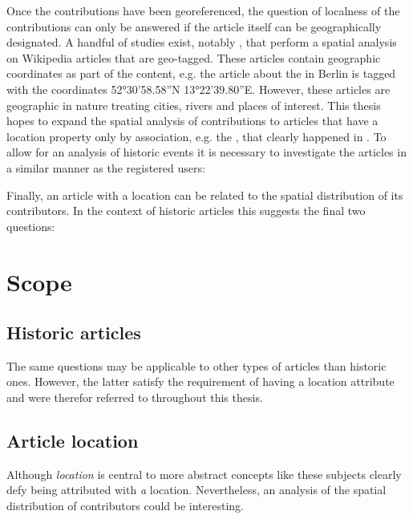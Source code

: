 Once the contributions have been georeferenced, the question of localness of the contributions can only be answered if the article itself can be geographically designated. 
A handful of studies exist, notably \cite{hardy2011volunteered,hecht2010localness}, that perform a spatial analysis on Wikipedia articles that are geo-tagged.
These articles contain geographic coordinates as part of the content, e.g. the article about the  in Berlin is tagged with the coordinates 52°30'58.58''N 13°22'39.80''E.
However, these articles are geographic in nature treating cities, rivers and places of interest. 
This thesis hopes to expand the spatial analysis of contributions to articles that have a location property only by association, e.g. the , that clearly happened in .
To allow for an analysis of historic events it is necessary to investigate the articles in a similar manner as the registered users:


Finally, an article with a location can be related to the spatial distribution of its contributors.
In the context of historic articles this suggests the final two questions:


\section{Scope}

\subsection{Historic articles}
The same questions may be applicable to other types of articles than historic ones.
However, the latter satisfy the requirement of having a location attribute and were therefor referred to throughout this thesis.

\subsection{Article location}
Although \emph{location} is central to more abstract concepts like  these subjects clearly defy being attributed with \emph{a} location.
Nevertheless, an analysis of the spatial distribution of contributors could be interesting. 
